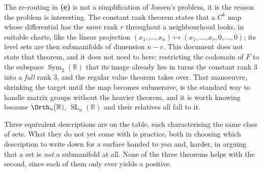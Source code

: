 \begin{ainote}
The re-routing in \textbf{(e)} is not a simplification of Jossen's problem, it is the reason the
problem is interesting. The constant rank theorem states that a $C^k$ map whose differential has
the \emph{same} rank $r$ throughout a neighbourhood looks, in suitable charts, like the linear
projection $(x_1,\dots,x_n) \mapsto (x_1,\dots,x_r,0,\dots,0)$; its level sets are then
submanifolds of dimension $n-r$. This document does not state that theorem, and it does not need
to here: restricting the codomain of $F$ to the subspace $\operatorname{Sym}_2(\mathbb{R})$ that
its image already lies in turns the constant rank $3$ into a \emph{full} rank $3$, and the regular
value theorem takes over. That manoeuvre, shrinking the target until the map becomes submersive,
is the standard way to handle matrix groups without the heavier theorem, and it is worth
knowing because $\Orth_n(\mathbb{R})$, $\operatorname{SL}_n(\mathbb{R})$ and their relatives all
fall to it.
\end{ainote}

Three equivalent descriptions are on the table, each characterising the same class of sets. What
they do not yet come with is practice, both in choosing which description to write down for a
surface handed to you and, harder, in arguing that a set is \emph{not} a submanifold at all.
None of the three theorems helps with the second, since each of them only ever yields a positive.
